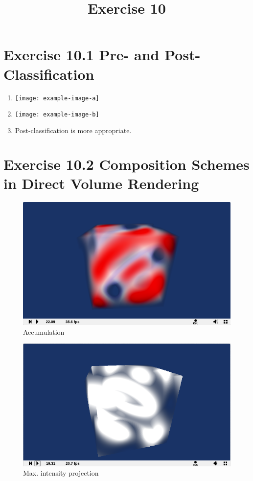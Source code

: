 \documentclass[a4paper]{article}
\date{}
\author{}
\title{Exercise 10}
\begin{document}
\maketitle 
\thispagestyle{fancy}


\section*{Exercise 10.1 Pre- and Post-Classification}

\begin{enumerate}
	\item 
	\begin{minipage}{\linewidth}
		\centering
		\texttt{[image: example-image-a]}
	\end{minipage}
	
	\item 
		\begin{minipage}{\linewidth}
			\centering
			\texttt{[image: example-image-b]}
		\end{minipage}
	\item Post-classification is more appropriate.
\end{enumerate}

\newpage
\section*{Exercise 10.2 Composition Schemes in Direct Volume Rendering}

\begin{figure}[!ht]
	\centering
	\includegraphics[width=0.62\linewidth]{1}
	\caption{Accumulation}
	\label{fig:1}
\end{figure}

\begin{figure}[!ht]
	\centering
	\includegraphics[width=0.62\linewidth]{2}
	\caption{Max. intensity projection}
	\label{fig:2}
\end{figure}
\end{document}
